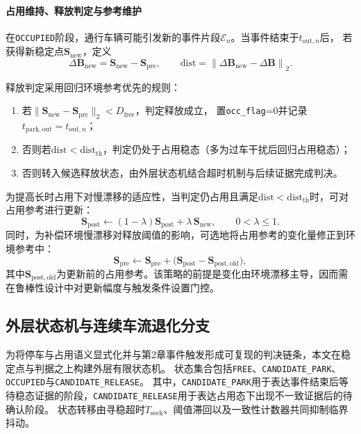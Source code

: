 \documentclass{xdupgthesis}
\begin{document}
\paragraph{占用维持、释放判定与参考维护}
在\texttt{OCCUPIED}阶段，通行车辆可能引发新的事件片段$\mathcal{E}_n$。当事件结束于$t_{\mathrm{out},n}$后，
若获得新稳定点$\mathbf{S}_{\mathrm{new}}$，定义
\begin{equation}
\Delta\mathbf{B}_{\mathrm{new}}=\mathbf{S}_{\mathrm{new}}-\mathbf{S}_{\mathrm{pre}},\qquad
\mathrm{dist}=\left\lVert \Delta\mathbf{B}_{\mathrm{new}}-\Delta\mathbf{B}\right\rVert_2.
\label{eq:ch4_dist}
\end{equation}

释放判定采用回归环境参考优先的规则：
\begin{enumerate}
  \item 若$\lVert\mathbf{S}_{\mathrm{new}}-\mathbf{S}_{\mathrm{pre}}\rVert_2<D_{\mathrm{free}}$，判定释放成立，
  置\texttt{occ\_flag}=0并记录$t_{\mathrm{park,out}}=t_{\mathrm{out},n}$；
  \item 否则若$\mathrm{dist}<\mathrm{dist}_{\mathrm{th}}$，判定仍处于占用稳态（多为过车干扰后回归占用稳态）；
  \item 否则转入候选释放状态，由外层状态机结合超时机制与后续证据完成判决。
\end{enumerate}

为提高长时占用下对慢漂移的适应性，当判定仍占用且满足$\mathrm{dist}<\mathrm{dist}_{\mathrm{th}}$时，可对占用参考进行更新：
\begin{equation}
\mathbf{S}_{\mathrm{post}}\leftarrow (1-\lambda)\mathbf{S}_{\mathrm{post}}+\lambda\,\mathbf{S}_{\mathrm{new}},\qquad 0<\lambda\le 1.
\label{eq:ch4_post_ema}
\end{equation}
同时，为补偿环境慢漂移对释放阈值的影响，可选地将占用参考的变化量修正到环境参考中：
\begin{equation}
\mathbf{S}_{\mathrm{pre}}\leftarrow \mathbf{S}_{\mathrm{pre}}+\bigl(\mathbf{S}_{\mathrm{post}}-\mathbf{S}_{\mathrm{post,old}}\bigr),
\label{eq:ch4_pre_comp}
\end{equation}
其中$\mathbf{S}_{\mathrm{post,old}}$为更新前的占用参考。该策略的前提是变化由环境漂移主导，因而需在鲁棒性设计中对更新幅度与触发条件设置门控。

\subsection{外层状态机与连续车流退化分支}
\label{subsec:ch4_fsm}

为将停车与占用语义显式化并与第2章事件触发形成可复现的判决链条，本文在稳定点与判据之上构建外层有限状态机。
状态集合包括\texttt{FREE}、\texttt{CANDIDATE\_PARK}、\texttt{OCCUPIED}与\texttt{CANDIDATE\_RELEASE}。
其中，\texttt{CANDIDATE\_PARK}用于表达事件结束后等待稳态证据的阶段，\texttt{CANDIDATE\_RELEASE}用于表达占用态下出现不一致证据后的待确认阶段。
状态转移由寻稳超时$T_{\mathrm{seek}}$、阈值滞回以及一致性计数器共同抑制临界抖动。
\end{document}
